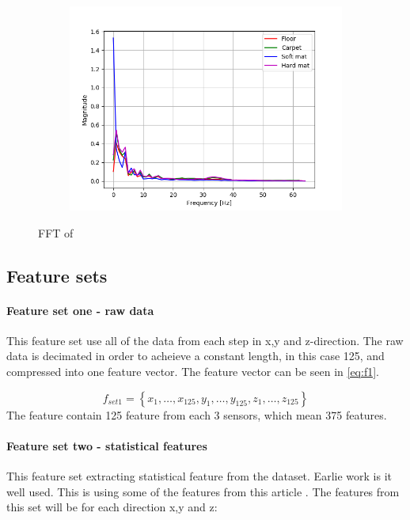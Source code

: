 \documentclass[USenglish]{ifimaster}  %
\begin{document}
\begin{figure}[h]
\begin{subfigure}{\linewidth}
		\includegraphics[scale=0.4]{Figures/fftx}
		\caption{}
		\label{fig:sub3}
	\end{subfigure}
	\caption{FFT of }
	\label{fig:fft}
\end{figure}
\FloatBarrier



\subsection{Feature sets}
\paragraph{Feature set one - raw data} This feature set use all of the data from each step in x,y and z-direction. The raw data is decimated in order to acheieve a constant length, in this case 125, and compressed into one feature vector. The feature vector can be seen in \ref{eq:f1}.

\begin{equation} \label{eq:f1}
f_{set1}= \left\{ x_1,\dotsc,x_{125},y_1, \dotsc,y_{125},z_1,\dotsc,z_{125} \right\}
\end{equation}
The feature contain 125 feature from each 3 sensors, which mean 375 features.


\paragraph{Feature set two - statistical features} This feature set extracting statistical feature from the dataset. Earlie work is it well used. This is using some of the features from this article \cite{Hoffmann20141790}. The features from this set will be for each direction x,y and z:
\end{document}
